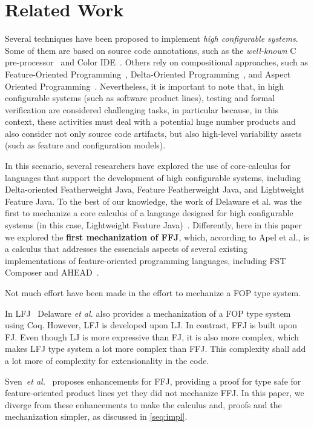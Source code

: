 \section{Related Work}\label{seq:related}

Several techniques have been proposed to implement
\emph{high configurable systems}. Some of
them are based on source code annotations, such as
the \emph{well-known} C pre-processor~\cite{} and Color IDE~\cite{}. Others
rely on compositional approaches, such as
Feature-Oriented Programming~\cite{}, Delta-Oriented Programming~\cite{}, 
and Aspect Oriented Programming~\cite{}. Nevertheless, it is important to
note that, in high configurable systems (such as software
product lines), testing and formal verification are considered
challenging tasks, in particular because, in this context,
these activities must deal with a potential huge number
products and also consider not only source code artifacts,
but also high-level variability assets (such as feature and
configuration models).

In this scenario, several researchers have explored
the use of core-calculus for languages that
support the development of high configurable systems,
including Delta-oriented Featherweight Java, Feature
Featherweight Java, and Lightweight Feature Java.
To the best of our knowledge, the work of Delaware
et al. was the first to mechanize a core calculus
of a language designed for high configurable systems (in
this case, Lightweight Feature Java)~\cite{}. Differently, here in
this paper we explored the {\bf first mechanization of \acf{FFJ}},
which, according to Apel et al., is a calculus that
addresses the essencials aspects of several
existing implementations of feature-oriented programming
languages, including FST Composer and AHEAD~\cite{}. 

Not much effort have been made in the effort to mechanize a \ac{FOP} type system.

In \ac{LFJ}~\cite{delaware_machine-checked_2009} Delaware \textit{et al.}
also provides a mechanization of a \ac{FOP} type system using Coq. 
However, \ac{LFJ} is developed upon \ac{LJ}. In contrast, \ac{FFJ} is built upon \ac{FJ}.
Even though \ac{LJ} is more expressive than \ac{FJ}, it is also more complex,
which makes \ac{LFJ} type system a lot more complex than \ac{FFJ}. This complexity
shall add a lot more of complexity for extensionality in the code.

Sven~\textit{et al.}~\cite{prehofer_feature-oriented_1997} proposes enhancements for \ac{FFJ},
providing a proof for type safe for feature-oriented product lines yet they did not mechanize \ac{FFJ}.
In this paper, we diverge from these enhancements to make the calculus and, proofs and the mechanization simpler, as discussed
in \ref{seq:impl}.
